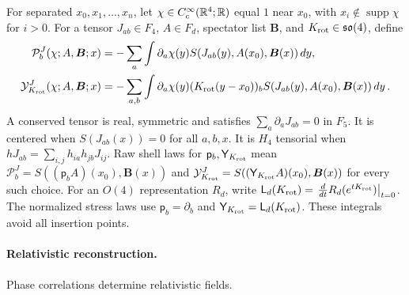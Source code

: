 \begin{definition}\label{def:stress-laws}
For separated $x_0,x_1,\ldots,x_n$, let $\chi\in C_c^\infty(\mathbb{R}^4;\mathbb{R})$ equal $1$ near $x_0$, with $x_i\notin\operatorname{supp}\chi$ for $i>0$. For a tensor $J_{ab}\in F_4$, $A\in F_d$, spectator list $\boldsymbol B$, and $K_{\rm rot}\in\mathfrak{so}(4)$, define
\begin{align}\label{eq:shell-flux}
\mathcal P_b^J(\chi;A,\boldsymbol B;x)&=-\sum_a\int\partial_a\chi(y)S(J_{ab}(y),A(x_0),\boldsymbol B(x))\,dy,\\
\mathcal Y_{K_{\rm rot}}^J(\chi;A,\boldsymbol B;x)&=-\sum_{a,b}\int\partial_a\chi(y)(K_{\rm rot}(y-x_0))_bS(J_{ab}(y),A(x_0),\boldsymbol B(x))\,dy\,.
\end{align}
A conserved tensor is real, symmetric and satisfies $\sum_a\partial_aJ_{ab}=0$ in $F_5$. It is centered when $S(J_{ab}(x))=0$ for all $a,b,x$. It is $H_4$ tensorial when $hJ_{ab}=\sum_{i,j}h_{ia}h_{jb}J_{ij}$. Raw shell laws for $\mathsf p_b,\mathsf Y_{K_{\rm rot}}$ mean $\mathcal P_b^J=S((\mathsf p_bA)(x_0),\boldsymbol B(x))$ and $\mathcal Y_{K_{\rm rot}}^J=S((\mathsf Y_{K_{\rm rot}}A)(x_0),\boldsymbol B(x))$ for every such choice. For an $O(4)$ representation $R_d$, write $\mathsf L_d(K_{\rm rot})=\left.\frac d{dt}R_d(e^{tK_{\rm rot}})\right|_{t=0}$. The normalized stress laws use $\mathsf p_b=\partial_b$ and $\mathsf Y_{K_{\rm rot}}=\mathsf L_d(K_{\rm rot})$. These integrals avoid all insertion points.
\end{definition}

\paragraph{Relativistic reconstruction.} Phase correlations determine relativistic fields.

